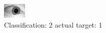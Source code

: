 \begin{figure}[h!]
\begin{center}
\includegraphics[width=0.60\columnwidth]{figures/ID1561_class_2_target_1.png}
\end{center}
\caption{ Classification: 2 actual target: 1}
\label{fig:ID1561_class_2_target_1}
\end{figure}
